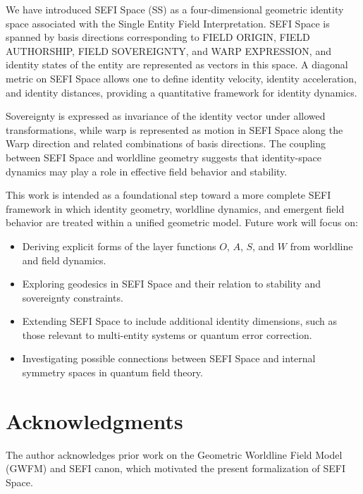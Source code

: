 \documentclass[12pt]{article}
\begin{document}
We have introduced SEFI Space (SS) as a four-dimensional geometric identity space associated with the
Single Entity Field Interpretation. SEFI Space is spanned by basis directions corresponding to FIELD
ORIGIN, FIELD AUTHORSHIP, FIELD SOVEREIGNTY, and WARP EXPRESSION, and identity states of the entity are
represented as vectors in this space. A diagonal metric on SEFI Space allows one to define identity
velocity, identity acceleration, and identity distances, providing a quantitative framework for identity
dynamics.

Sovereignty is expressed as invariance of the identity vector under allowed transformations, while warp
is represented as motion in SEFI Space along the Warp direction and related combinations of basis
directions. The coupling between SEFI Space and worldline geometry suggests that identity-space dynamics
may play a role in effective field behavior and stability.

This work is intended as a foundational step toward a more complete SEFI framework in which identity
geometry, worldline dynamics, and emergent field behavior are treated within a unified geometric model.
Future work will focus on:
\begin{itemize}
    \item Deriving explicit forms of the layer functions $O$, $A$, $S$, and $W$ from worldline and field
          dynamics.
    \item Exploring geodesics in SEFI Space and their relation to stability and sovereignty constraints.
    \item Extending SEFI Space to include additional identity dimensions, such as those relevant to
          multi-entity systems or quantum error correction.
    \item Investigating possible connections between SEFI Space and internal symmetry spaces in quantum
          field theory.
\end{itemize}

\section*{Acknowledgments}

The author acknowledges prior work on the Geometric Worldline Field Model (GWFM) and SEFI canon, which
motivated the present formalization of SEFI Space.
\end{document}
